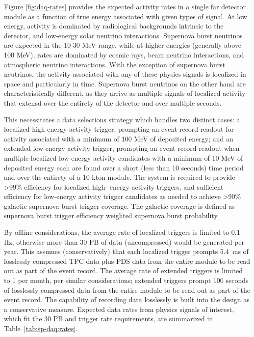Figure \ref{fig:daq-rates} provides the expected activity rates in a
single far detector module as a function of true energy associated
with given types of signal.
At low energy, activity is dominated by radiological backgrounds
intrinsic to the detector, and
low-energy solar neutrino interactions. Supernova burst neutrinos are
expected in the 10-30 MeV range, while at higher energies (generally
above 100 MeV), rates are dominated by cosmic rays, beam neutrino interactions,
and atmospheric neutrino interactions. With the exception of supernova
burst neutrinos, the activity associated with any of these physics
signals is localized in space and particularly in time. Supernova burst
neutrinos on the other hand are characteristically different, as they arrive as multiple
signals of localized activity that extensd over the entirety of the
detector and over multiple seconds. 

This necessitates a data selections strategy which handles two
distinct cases: a localized high energy activity trigger, prompting an event record readout for
activity associated with a minimum of 100 MeV of deposited energy; and an extended
low-energy activity trigger, prompting an event record readout when
multiple localized low energy activity candidates with a minimum of
10 MeV of deposited energy each are found over a short (less than 10
seconds) time period and over the entirety of a 10 kton module. The
system is required to provide >99\% efficiency for localized high-
energy activity triggers, and sufficient efficiency for low-energy
activity trigger candidates as needed to achieve >90\% galactic
supernova burst trigger coverage. The galactic coverage is defined as
supernova burst trigger efficiency weighted supernova burst probability.

By offline considerations, the average rate of localized triggers is limited to 0.1 Hz, otherwise
more than 30 PB of data (uncompressed) would be generated per
year. This assumes (conservatively) that each localized
trigger prompts 5.4~ms of losslessly compressed TPC data plus PDS data from
the entire module to be read out as part of the event record. The average rate
of extended triggers is limited to 1 per month, per similar
considerations; extended triggers prompt 100 seconds of losslessly
compressed data from the entire module to be read out as part of the
event record. The capability of recording data losslessly is built
into the design as a conservative measure. Expected
data rates from physics signals of interest, which fit the 30 PB and
trigger rate requirements, are summarized in Table~\ref{tab:sp-daq:rates}.

